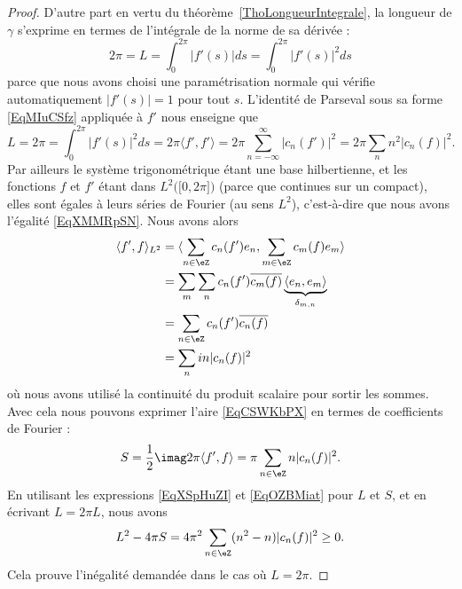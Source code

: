 \begin{proof}
    D'autre part en vertu du théorème~\ref{ThoLongueurIntegrale}, la longueur de \( \gamma\) s'exprime en termes de l'intégrale de la norme de sa dérivée :
    \begin{equation}
        2\pi=L=\int_0^{2\pi}| f'(s) |ds=\int_0^{2\pi}| f'(s) |^2ds
    \end{equation}
    parce que nous avons choisi une paramétrisation normale qui vérifie automatiquement \( | f'(s) |=1\) pour tout \( s\). L'identité de Parseval sous sa forme \eqref{EqMIuCSfz} appliquée à \( f'\) nous enseigne que
    \begin{equation}        \label{EqXSpHuZI}
        L=2\pi=\int_0^{2\pi}| f'(s) |^2ds=2\pi\langle f', f'\rangle=2\pi\sum_{n=-\infty}^{\infty}| c_n(f') |^2=2\pi\sum_nn^2| c_n(f) |^2.
    \end{equation}
    Par ailleurs le système trigonométrique étant une base hilbertienne, et les fonctions \( f\) et \( f'\) étant dans \( L^2\big( \mathopen[ 0 , 2\pi \mathclose] \big)\) (parce que continues sur un compact), elles sont égales à leurs séries de Fourier (au sens \( L^2\)), c'est-à-dire que nous avons l'égalité \eqref{EqXMMRpSN}. Nous avons alors
    \begin{subequations}
        \begin{align}
            \langle f', f\rangle_{L^2} &=\langle \sum_{n\in \eZ}c_n(f')e_n, \sum_{m\in \eZ}c_m(f)e_m\rangle \\
            &=\sum_m\sum_nc_n(f')\overline{ c_m(f) }\underbrace{\langle e_n, e_m\rangle }_{\delta_{m,n}}\\
            &=\sum_{n\in \eZ}c_n(f')\overline{ c_n(f) }\\
            &=\sum_nin| c_n(f) |^2
        \end{align}
    \end{subequations}
    où nous avons utilisé la continuité du produit scalaire pour sortir les sommes. Avec cela nous pouvons exprimer l'aire \eqref{EqCSWKbPX} en termes de coefficients de Fourier :
    \begin{equation}    \label{EqOZBMiat}
        S=\frac{ 1 }{2}\imag2\pi\langle f', f\rangle =\pi\sum_{n\in \eZ}n| c_n(f) |^2.
    \end{equation}
    En utilisant les expressions \eqref{EqXSpHuZI} et \eqref{EqOZBMiat} pour \( L\) et \( S\), et en écrivant \( L=2\pi L\), nous avons
    \begin{equation}
        L^2-4\pi S=4\pi^2\sum_{n\in \eZ}(n^2-n)| c_n(f) |^2\geq 0.
    \end{equation}
    Cela prouve l'inégalité demandée dans le cas où \( L=2\pi\).


\end{proof}
